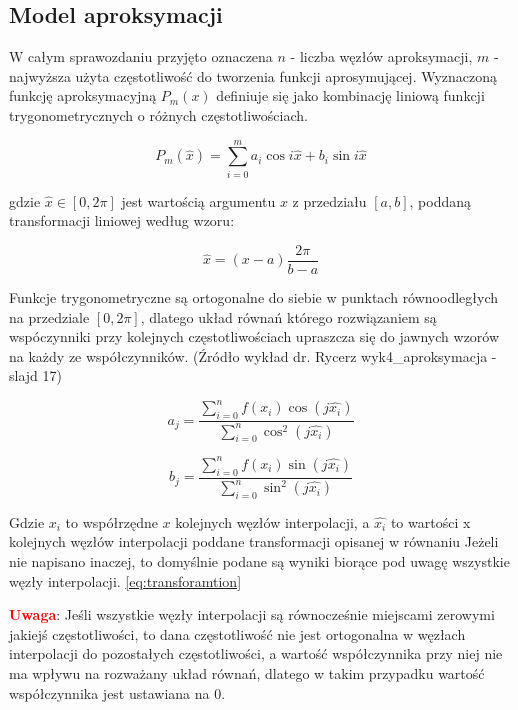\documentclass[twoside]{article}
\begin{document}
\subsection{Model aproksymacji}
W całym sprawozdaniu przyjęto oznaczena $n$ - liczba węzłów aproksymacji, $m$ - najwyższa użyta częstotliwość do tworzenia funkcji aprosymującej.
Wyznaczoną funkcję aproksymacyjną $P_m(x)$  definiuje się jako kombinację liniową funkcji trygonometrycznych o różnych częstotliwościach.

\begin{equation}
P_m(\hat{x}) = \sum_{i=0}^{m} a_i \cos{i\hat{x}} + b_i \sin{i\hat{x}}
\end{equation}

gdzie $\hat{x} \in [0, 2\pi]$ jest wartością argumentu $x$ z przedziału $[a, b]$, poddaną transformacji liniowej według wzoru:

\begin{equation}
\hat{x} = (x - a) \frac{2\pi}{b-a}
\label{eq:transforamtion}
\end{equation}


Funkcje trygonometryczne są ortogonalne do siebie w punktach równoodległych na przedziale $[0, 2\pi]$, dlatego układ równań którego rozwiązaniem są 
wspóczynniki przy kolejnych częstotliwościach upraszcza się do jawnych wzorów na każdy ze współczynników. (Źródło wykład dr. Rycerz wyk4\_aproksymacja - slajd 17)

\begin{equation}
a_j = \frac{\sum_{i=0}^{n}f(x_i)\cos{(j\hat{x_i})}}{\sum_{i=0}^{n}\cos^{2}(j\hat{x_i})}
\end{equation}

\begin{equation}
b_j = \frac{\sum_{i=0}^{n}f(x_i)\sin{(j\hat{x_i})}}{\sum_{i=0}^{n}\sin^{2}(j\hat{x_i})}
\end{equation}

Gdzie $x_i$ to współrzędne $x$ kolejnych węzłów interpolacji, a $\hat{x_i}$ to wartości x kolejnych węzłów interpolacji poddane transformacji opisanej w równaniu
Jeżeli nie napisano inaczej, to domyślnie podane są wyniki biorące pod uwagę wszystkie węzły interpolacji.
\ref{eq:transforamtion}

\vspace{5pt}

\textbf{\textcolor{red}{Uwaga}}: Jeśli wszystkie węzły interpolacji są równocześnie miejscami zerowymi jakiejś częstotliwości, to dana częstotliwość nie jest
ortogonalna w węzłach interpolacji do pozostałych częstotliwości, a wartość współczynnika przy niej nie ma wpływu na rozważany układ równań, dlatego
w takim przypadku wartość współczynnika jest ustawiana na 0.
\end{document}
